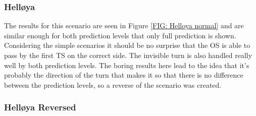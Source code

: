 \subsubsection{Helløya}
The results for this scenario are seen in Figure \ref{FIG: Helloya normal} and are similar enough for both prediction levels that only
full prediction is shown. Considering the simple scenarios it should be no surprise that the OS is able to pass by the first TS on the correct side.
The invisible turn is also handled really well by both prediction levels. The boring results here lead to the idea that it's probably the direction
of the turn that makes it so that there is no difference between the prediction levels, so a reverse of the scenario was created.

\subsubsection{Helløya Reversed}

